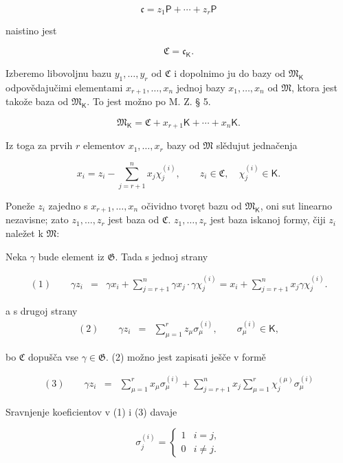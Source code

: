\documentclass[11pt]{article}
\begin{document}
\[
\mathfrak c=z_1\mathsf P+\cdots+z_r\mathsf P
\]

naistino jest

\[
\mathfrak C=\mathfrak c_{\mathsf K}.
\]

Izberemo libovoljnu bazu \(y_1,\ldots,y_r\) od \(\mathfrak C\) i dopolnimo ju do bazy od \(\mathfrak M_{\mathsf K}\) odpovědajučimi elementami \(x_{r+1},\ldots,x_n\) jednoj bazy \(x_1,\ldots,x_n\) od \(\mathfrak M\), ktora jest takože baza od \(\mathfrak M_{\mathsf K}\). To jest možno po M. Z. § 5.

\[
\mathfrak M_{\mathsf K}=\mathfrak C+x_{r+1}\mathsf K+\cdots+x_n\mathsf K.
\]

Iz toga za prvih \(r\) elementov \(x_1,\ldots,x_r\) bazy od \(\mathfrak M\) slědujut jednačenja

\[
x_i=z_i-\sum_{j=r+1}^{n}x_j\chi_j^{(i)},\qquad
z_i\in\mathfrak C,\quad \chi_j^{(i)}\in\mathsf K.
\]

Poneže \(z_i\) zajedno s \(x_{r+1},\ldots,x_n\) očividno tvoręt bazu od \(\mathfrak M_{\mathsf K}\), oni sut linearno nezavisne; zato \(z_1,\ldots,z_r\) jest baza od \(\mathfrak C\). \(z_1,\ldots,z_r\) jest baza iskanoj formy, čiji \(z_i\) naležet k \(\mathfrak M\):

Neka \(\gamma\) bude element iz \(\mathfrak G\). Tada s jednoj strany

\[
\begin{array}{rcl}
(1)\qquad \gamma z_i
&=&\gamma x_i+\displaystyle\sum_{j=r+1}^{n}\gamma x_j\cdot \gamma\chi_j^{(i)}
=x_i+\displaystyle\sum_{j=r+1}^{n}x_j\gamma\chi_j^{(i)}.
\end{array}
\]

a s drugoj strany
\[
\begin{array}{rcl}
(2)\qquad \gamma z_i&=&\displaystyle\sum_{\mu=1}^{r}z_\mu\sigma_\mu^{(i)},
\qquad \sigma_\mu^{(i)}\in\mathsf K,
\end{array}
\]

bo \(\mathfrak C\) dopušča vse \(\gamma\in\mathfrak G\). (2) možno jest zapisati ješče v formě

\[
\begin{array}{rcl}
(3)\qquad \gamma z_i
&=&\displaystyle\sum_{\mu=1}^{r}x_\mu\sigma_\mu^{(i)}
+\displaystyle\sum_{j=r+1}^{n}x_j\sum_{\mu=1}^{r}\chi_j^{(\mu)}\sigma_\mu^{(i)}
\end{array}
\]

Sravnjenje koeficientov v (1) i (3) davaje

\[
\sigma_j^{(i)}=
\begin{cases}
1 & i=j,\\
0 & i\ne j.
\end{cases}
\]
\end{document}
